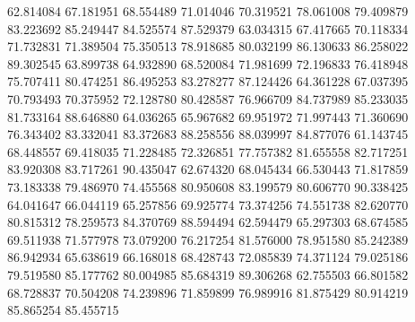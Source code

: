 62.814084
67.181951
68.554489
71.014046
70.319521
78.061008
79.409879
83.223692
85.249447
84.525574
87.529379
63.034315
67.417665
70.118334
71.732831
71.389504
75.350513
78.918685
80.032199
86.130633
86.258022
89.302545
63.899738
64.932890
68.520084
71.981699
72.196833
76.418948
75.707411
80.474251
86.495253
83.278277
87.124426
64.361228
67.037395
70.793493
70.375952
72.128780
80.428587
76.966709
84.737989
85.233035
81.733164
88.646880
64.036265
65.967682
69.951972
71.997443
71.360690
76.343402
83.332041
83.372683
88.258556
88.039997
84.877076
61.143745
68.448557
69.418035
71.228485
72.326851
77.757382
81.655558
82.717251
83.920308
83.717261
90.435047
62.674320
68.045434
66.530443
71.817859
73.183338
79.486970
74.455568
80.950608
83.199579
80.606770
90.338425
64.041647
66.044119
65.257856
69.925774
73.374256
74.551738
82.620770
80.815312
78.259573
84.370769
88.594494
62.594479
65.297303
68.674585
69.511938
71.577978
73.079200
76.217254
81.576000
78.951580
85.242389
86.942934
65.638619
66.168018
68.428743
72.085839
74.371124
79.025186
79.519580
85.177762
80.004985
85.684319
89.306268
62.755503
66.801582
68.728837
70.504208
74.239896
71.859899
76.989916
81.875429
80.914219
85.865254
85.455715
